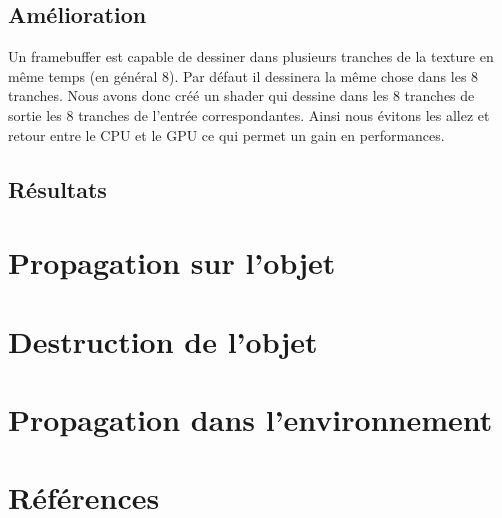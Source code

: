 \documentclass[a4paper,10pt]{article}
\begin{document}
\subsection{Amélioration}
    Un framebuffer est capable de dessiner dans plusieurs tranches de la texture en même temps (en général 8). Par défaut il dessinera la même chose dans les 8 tranches. Nous avons donc créé un shader qui dessine dans les 8 tranches de sortie les 8 tranches de l'entrée correspondantes. Ainsi nous évitons les allez et retour entre le CPU et le GPU ce qui permet un gain en performances.


\subsection{Résultats}




\section{Propagation sur l'objet}





\section{Destruction de l'objet}





\section{Propagation dans l'environnement}


\section{Références}


\end{document}
